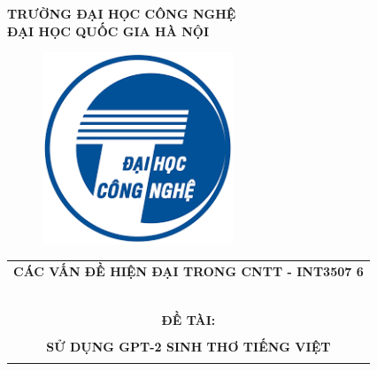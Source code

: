 \documentclass[a4paper]{article}
\theoremstyle{definition}
\begin{document}
\begin{titlepage}
\begin{center}
\textbf{\Large TRƯỜNG ĐẠI HỌC CÔNG NGHỆ}\\
\textbf{\Large ĐẠI HỌC QUỐC GIA HÀ NỘI} \\
\end{center}

\vspace{1cm}

\begin{figure}[h!]
\begin{center}
\includegraphics[width=5.7cm]{Images/uet.png}
\end{center}
\end{figure}

\vspace{1cm}


\begin{center}
\begin{tabular}{c}
\multicolumn{1}{l}{\textbf{{\Large CÁC VẤN ĐỀ HIỆN ĐẠI TRONG CNTT - INT3507 6}}}\\
~~\\
\hline
\\

\textbf{\Large ĐỀ TÀI: } \\
\\
\textbf{\Large SỬ DỤNG GPT-2 SINH THƠ TIẾNG VIỆT}\\

\\
\hline
\end{tabular}
\end{center}

\vspace{1.5cm}

    

\end{titlepage}
\end{document}
